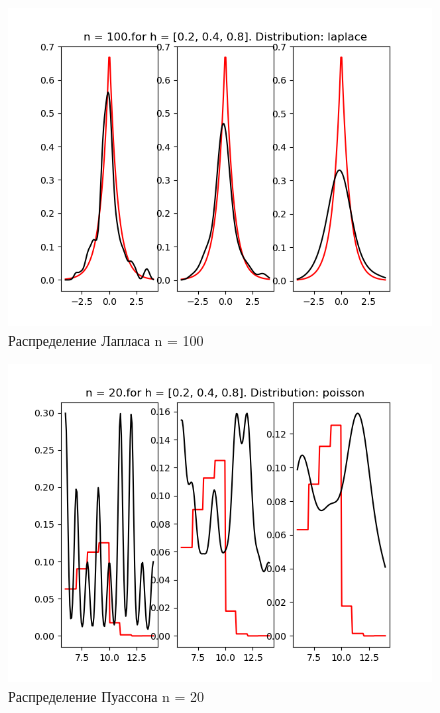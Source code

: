 \documentclass[a4]{article}
\begin{document}
\begin{center}
\begin{figure}[h!]
				\includegraphics[width=\textwidth]{laplaceker100.png}
				\caption[Распределение Лапласа n = 100]{Распределение Лапласа n = 100}
			\end{figure}
			\newpage
			\begin{figure}[h!]
				\includegraphics[width=\textwidth]{poissonker20.png}
				\caption[Распределение Пуассона n = 20]{Распределение Пуассона n = 20}
			\end{figure}
			\newpage
			\begin{figure}[h!]

\end{figure}
\end{center}
\end{document}
